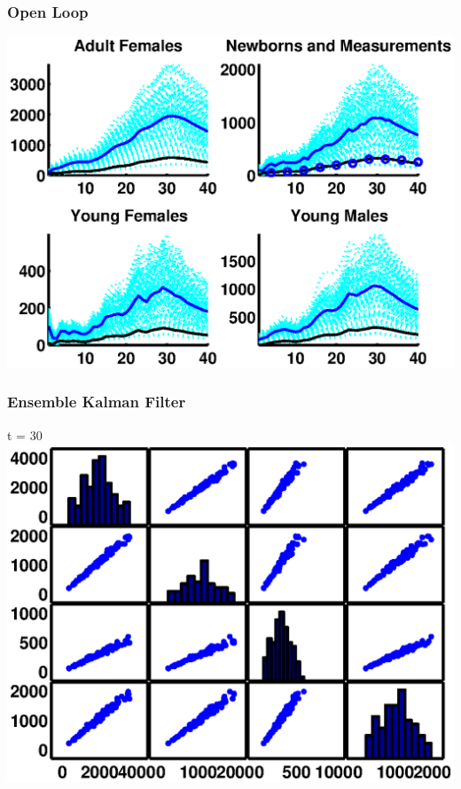 \documentclass[mathserif]{beamer}
\begin{document}
\begin{frame}
\frametitle{Open Loop}
\begin{center}
\includegraphics[width=1\textwidth]{openloop}
\end{center}
\end{frame}

\begin{frame}
\begin{center}
\frametitle{Ensemble Kalman Filter}
t = 30
\includegraphics[width=1\textwidth]{ol30cov}
\end{center}
\end{frame}
\end{document}
